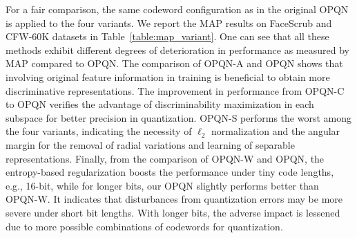 \documentclass{elsarticle}
\begin{document}
{\linespread{1.2}
\begin{table}[htbp]
    \centering
    \small
    \caption{MAP ($\%$) results of three variants of OPQN for seen identity retrieval}
    \label{table:map_variant}
\end{table}
}

For a fair comparison, the same codeword configuration as in the original OPQN is applied to the four variants. %
We report the MAP results on FaceScrub and CFW-60K datasets in Table~\ref{table:map_variant}. One can see that all these methods exhibit different degrees of deterioration in performance as measured by MAP compared to OPQN. The comparison of OPQN-A and OPQN shows that involving original feature information in training is beneficial to obtain more discriminative representations. The improvement in performance from OPQN-C to OPQN verifies the advantage of discriminability maximization in each subspace for better precision in quantization. OPQN-S performs the worst among the four variants, indicating the necessity of $\ell_2$ normalization and the angular margin for the removal of radial variations and learning of separable representations. Finally, from the comparison of OPQN-W and OPQN, the entropy-based regularization boosts the performance under tiny code lengths, e.g., 16-bit, while for longer bits, our OPQN slightly performs better than OPQN-W. %
It indicates that disturbances from quantization errors may be more severe under short bit lengths. With longer bits, the adverse impact is lessened due to more possible combinations of codewords for quantization. 
\end{document}
